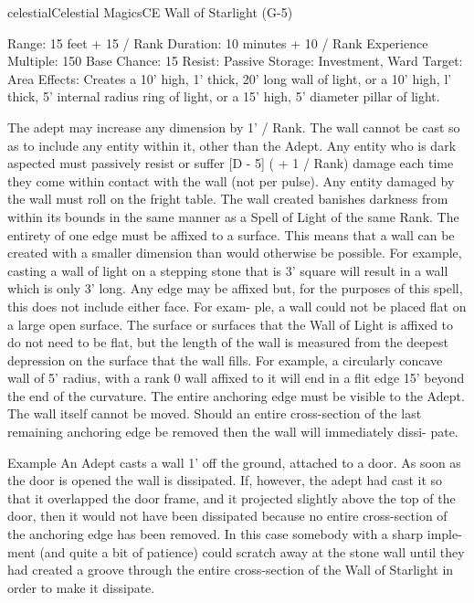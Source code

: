 \begin{College}[1.3]{celestial}{Celestial Magics}{CE}
Wall of Starlight (G-5) 

Range: 15 feet + 15 / Rank 
Duration: 10 minutes + 10 / Rank 
Experience Multiple: 150 
Base Chance: 15%
Resist: Passive 
Storage: Investment, Ward 
Target: Area 
Effects: Creates a 10’ high, 1’ thick, 20’ long wall 
of  light,  or  a  10’  high,  l’  thick,  5’  internal  radius 
ring  of  light,  or  a  15’  high,  5’  diameter  pillar  of 
light. 

The  adept  may  increase  any  dimension  by  1’  / 
Rank. The wall cannot be cast so as to include any 
entity  within  it,  other  than  the  Adept.  Any  entity 
who is dark aspected must passively resist or suffer 
[D - 5] ( + 1 / Rank) damage each time they come 
within  contact  with  the  wall  (not  per  pulse).  Any 
entity  damaged by  the  wall  must  roll  on  the  fright 
table.  The  wall  created  banishes  darkness  from 
within its bounds in the same manner as a Spell of 
Light  of  the  same  Rank.  The  entirety  of  one  edge 
must be affixed to a surface. This means that a wall 
can  be  created  with  a  smaller  dimension  than 
would otherwise be possible. For  example, casting 
a wall of light on a stepping stone that is 3’ square 
will  result  in  a  wall  which  is  only  3’  long.  Any 
edge  may  be  affixed  but,  for  the  purposes  of  this 
spell,  this  does  not  include  either  face.  For  exam-
ple, a wall could not be placed flat on a large open 
surface.  The  surface  or  surfaces  that  the  Wall  of 
Light  is  affixed  to  do  not  need  to  be  flat,  but  the 
length  of  the  wall  is  measured  from  the  deepest 
depression  on  the  surface  that  the  wall  fills.  For 
example,  a  circularly  concave  wall  of  5’  radius, 
with  a  rank  0  wall  affixed  to  it  will  end  in  a  flit 
edge  15’  beyond  the  end  of  the  curvature.  The 
entire anchoring edge must be visible to the Adept. 
The  wall  itself  cannot  be  moved.  Should  an  entire 
cross-section  of  the  last  remaining  anchoring  edge 
be  removed  then  the  wall  will  immediately  dissi-
pate. 

Example 
An  Adept  casts  a  wall  1’  off  the  ground, 
attached to a door. As soon as the door is opened the wall 
is  dissipated.  If,  however,  the  adept  had  cast  it  so  that  it 
overlapped the door frame, and it projected slightly above 
the top of the door, then it would not have been dissipated 
because  no  entire  cross-section  of  the  anchoring  edge  has 
been removed. In this case somebody with a sharp imple-
ment  (and  quite  a  bit  of  patience)  could  scratch  away  at 
the stone wall until they had created a groove through the 
entire  cross-section  of  the  Wall  of  Starlight  in  order  to 
make it dissipate. 


\end{College}
